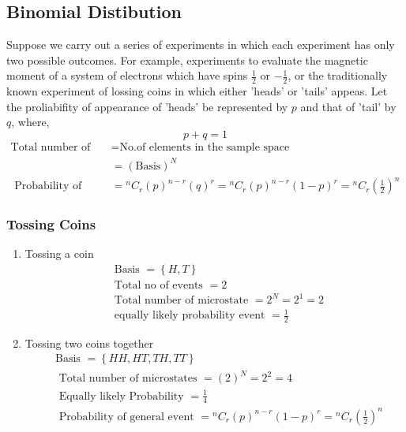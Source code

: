 \subsection{ Binomial Distibution}
Suppose we carry out a series of experiments in which each experiment has only two possible outcomes. For example, experiments to evaluate the magnetic moment of a system of electrons which have spins $\frac{1}{2}$ or $-\frac{1}{2}$, or the traditionally known experiment of lossing coins in which either 'heads' or 'tails' appeas. Let the proliabifity of appearance of 'heads' be represented by $p$ and that of 'tail' by $q$, where,
$$
p+q=1
$$
\begin{align*}
\text{Total number of microstate }&=\text{No.of elements in the sample space}\\&=\left(\text{Basis} \right)^N\\
\text { Probability of general event } 
&={ }^{n} C_{r}(p)^{n-r}(q)^{r} ={ }^{n} C_{r}(p)^{n-r}(1-p)^{r}=
{ }^{n} C_{r}\left(\frac{1}{2}\right)^{n}
\end{align*}
\subsubsection{ Tossing Coins}
\begin{enumerate}
	\item Tossing a coin
	\begin{align*}
	&\text{Basis }=\left\lbrace H,T\right\rbrace \\
	&\text{Total no of events }=2\\
	&\text{Total number of microstate }=2^N=2^1=2 \\
	&\text{equally likely probability event }=\frac{1}{2} 
	\end{align*}
	\item {Tossing two coins together}
	\begin{align*}
	&\text{Basis }=\left\lbrace H H, H T, T H, T T\right\rbrace \\
	&\text{ Total number of microstates }=(2)^{N}=2^2=4\\
	&\text{ Equally likely Probability }=\frac{1}{4} \\
	&\text { Probability of general event } 
	={ }^{n} C_{r}(p)^{n-r}(1-p)^{r} =
	{ }^{n} C_{r}\left(\frac{1}{2}\right)^{n}
	\end{align*}
\end{enumerate}
